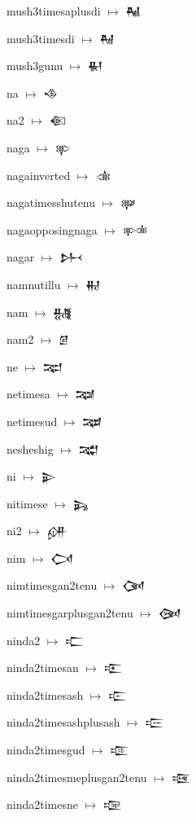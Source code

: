 {\noindent mush3timesaplusdi $\mapsto$ {\cufont 𒈻}\par
\noindent mush3timesdi $\mapsto$ {\cufont 𒈼}\par
\noindent mush3gunu $\mapsto$ {\cufont 𒈽}\par
\noindent na $\mapsto$ {\cufont 𒈾}\par
\noindent na2 $\mapsto$ {\cufont 𒈿}\par
\noindent naga $\mapsto$ {\cufont 𒉀}\par
\noindent nagainverted $\mapsto$ {\cufont 𒉁}\par
\noindent nagatimesshutenu $\mapsto$ {\cufont 𒉂}\par
\noindent nagaopposingnaga $\mapsto$ {\cufont 𒉃}\par
\noindent nagar $\mapsto$ {\cufont 𒉄}\par
\noindent namnutillu $\mapsto$ {\cufont 𒉅}\par
\noindent nam $\mapsto$ {\cufont 𒉆}\par
\noindent nam2 $\mapsto$ {\cufont 𒉇}\par
\noindent ne $\mapsto$ {\cufont 𒉈}\par
\noindent netimesa $\mapsto$ {\cufont 𒉉}\par
\noindent netimesud $\mapsto$ {\cufont 𒉊}\par
\noindent nesheshig $\mapsto$ {\cufont 𒉋}\par
\noindent ni $\mapsto$ {\cufont 𒉌}\par
\noindent nitimese $\mapsto$ {\cufont 𒉍}\par
\noindent ni2 $\mapsto$ {\cufont 𒉎}\par
\noindent nim $\mapsto$ {\cufont 𒉏}\par
\noindent nimtimesgan2tenu $\mapsto$ {\cufont 𒉐}\par
\noindent nimtimesgarplusgan2tenu $\mapsto$ {\cufont 𒉑}\par
\noindent ninda2 $\mapsto$ {\cufont 𒉒}\par
\noindent ninda2timesan $\mapsto$ {\cufont 𒉓}\par
\noindent ninda2timesash $\mapsto$ {\cufont 𒉔}\par
\noindent ninda2timesashplusash $\mapsto$ {\cufont 𒉕}\par
\noindent ninda2timesgud $\mapsto$ {\cufont 𒉖}\par
\noindent ninda2timesmeplusgan2tenu $\mapsto$ {\cufont 𒉗}\par
\noindent ninda2timesne $\mapsto$ {\cufont 𒉘}\par
}
